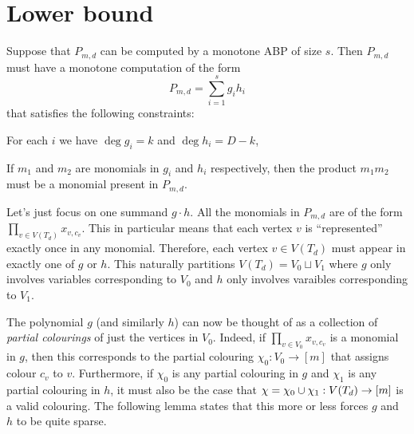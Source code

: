 \section{Lower bound}

Suppose that $P_{m,d}$ can be computed by a monotone ABP of size $s$. Then $P_{m,d}$ must have a monotone computation of the form
\[
P_{m,d} = \sum_{i=1}^s g_i h_i
\]
that satisfies the following constraints:
\begin{description}
  \itemsep 0pt
\item [Degree constraints] For each $i$ we have $\deg g_i = k$ and $\deg h_i = D - k$,
\item [Monotonicity] If $m_1$ and $m_2$ are monomials in $g_i$ and $h_i$ respectively, then the product $m_1m_2$ must be a monomial present in $P_{m,d}$.
\end{description}

Let's just focus on one summand $g \cdot h$.
All the monomials in $P_{m,d}$ are of the form $\prod_{v\in V(T_d)}{x_{v,c_v}}$. This in particular means that each vertex $v$ is ``represented'' exactly once in any monomial. Therefore, each vertex $v\in V(T_d)$ must appear in exactly one of $g$ or $h$. This naturally partitions $V(T_d) = V_0 \sqcup V_1$ where $g$ only involves variables corresponding to $V_0$ and $h$ only involves varaibles corresponding to $V_1$.

The polynomial $g$ (and similarly $h$) can now be thought of as a collection of \emph{partial colourings} of just the vertices in $V_0$. Indeed, if $\prod_{v\in V_0} x_{v,c_v}$ is a monomial in $g$, then this corresponds to the partial colouring $\chi_0: V_0 \rightarrow [m]$ that assigns colour $c_v$ to $v$. Furthermore, if $\chi_0$ is any partial colouring in $g$ and $\chi_1$ is any partial colouring in $h$, it must also be the case that $\chi = \chi_0 \cup \chi_1:V(T_d)\rightarrow[m]$ is a valid colouring. The following lemma states that this more or less forces $g$ and $h$ to be quite sparse.

